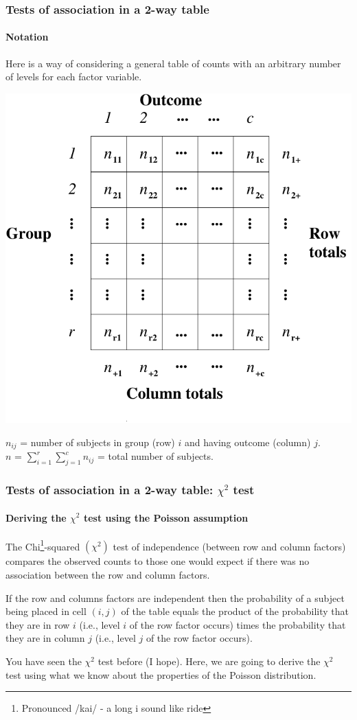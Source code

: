 \documentclass{beamer}\usepackage[]{graphicx}\usepackage[]{xcolor}
\begin{document}
\begin{frame}
\frametitle{Tests of association in a 2-way table}
\framesubtitle{Notation}

Here is a way of considering a general table of counts with an arbitrary number of levels for each factor variable.

\begin{center}
\includegraphics[scale=0.45]{Figures/table.pdf}
\end{center}

\vspace{-5mm}

$n_{ij}$ = number of subjects in group (row) $i$ and having outcome (column) $j$.\\
$n$ = $\sum\limits_{i=1}^r\sum\limits_{j=1}^c n_{ij}$ = total number of subjects.
\end{frame}


\begin{frame}
\frametitle{Tests of association in a 2-way table: $\chi^2$ test}
\framesubtitle{Deriving the $\chi^2$ test using the Poisson assumption}

The Chi\footnote{Pronounced /kai/ - a long i sound like ride}-squared $(\chi^2)$ test of independence (between row and column factors) compares the observed counts to those one would expect if there was no association between the row and column factors.

\medskip

If the row and columns factors are independent then the probability of a subject being placed in cell $(i,j)$ of the table equals the product of the probability that they are in row $i$ (i.e., level $i$ of the row factor occurs) times the probability that they are in column $j$ (i.e., level $j$ of the row factor occurs).

\medskip

You have seen the $\chi^2$ test before (I hope). Here, we are going to derive the $\chi^2$ test using what we know about the properties
of the Poisson distribution.

\end{frame}
\end{document}

